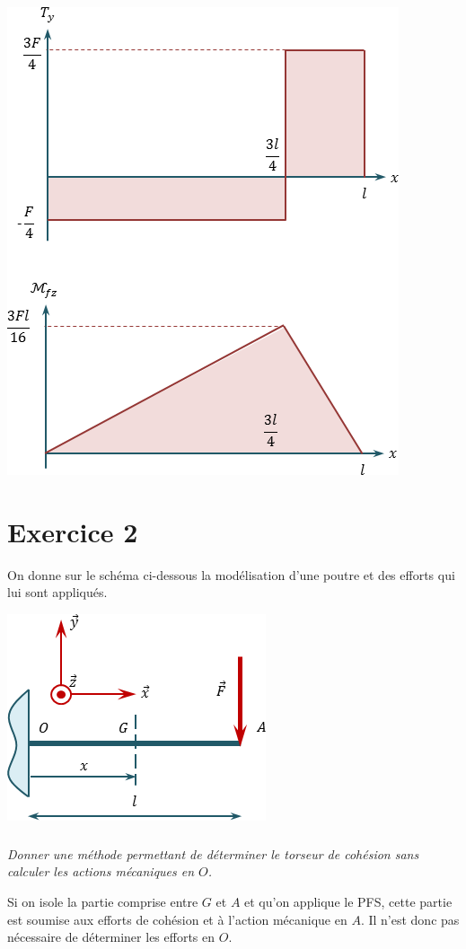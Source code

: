 \documentclass[10pt,fleqn]{article} %
\begin{document}
\begin{multicols}{2}
\begin{corrige}
\begin{center}
\includegraphics[width=.5\textwidth]{images/exo_01_corr}
\end{center}
\end{corrige}
\else 
\fi



\section*{Exercice 2}
\setcounter{subparagraph}{0}
On donne sur le schéma ci-dessous la modélisation d'une poutre et des efforts qui lui sont appliqués.
\begin{center}
\includegraphics[width=.45\textwidth]{images/exo_01_01}
\end{center}

\subparagraph{}
\textit{Donner une méthode permettant de déterminer le torseur de cohésion sans calculer les actions mécaniques en $O$.}
\ifprof
\begin{corrige} Si on isole la partie comprise entre $G$ et $A$ et qu'on applique le PFS, cette partie est soumise aux efforts de cohésion et à l'action mécanique en $A$. Il n'est donc pas nécessaire de déterminer les efforts en $O$.
\end{corrige}
\else
\fi


\end{multicols}
\end{document}
